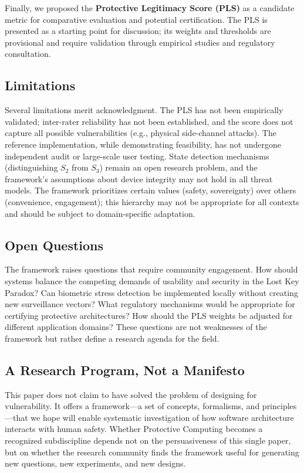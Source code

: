 \documentclass[acmsmall,review]{acmart}
\begin{document}
Finally, we proposed the \textbf{Protective Legitimacy Score (PLS)} as a candidate metric for comparative evaluation and potential certification. The PLS is presented as a starting point for discussion; its weights and thresholds are provisional and require validation through empirical studies and regulatory consultation.

\subsection{Limitations}

Several limitations merit acknowledgment. The PLS has not been empirically validated; inter-rater reliability has not been established, and the score does not capture all possible vulnerabilities (e.g., physical side-channel attacks). The reference implementation, while demonstrating feasibility, has not undergone independent audit or large-scale user testing. State detection mechanisms (distinguishing $S_2$ from $S_3$) remain an open research problem, and the framework's assumptions about device integrity may not hold in all threat models. The framework prioritizes certain values (safety, sovereignty) over others (convenience, engagement); this hierarchy may not be appropriate for all contexts and should be subject to domain-specific adaptation.

\subsection{Open Questions}

The framework raises questions that require community engagement. How should systems balance the competing demands of usability and security in the Lost Key Paradox? Can biometric stress detection be implemented locally without creating new surveillance vectors? What regulatory mechanisms would be appropriate for certifying protective architectures? How should the PLS weights be adjusted for different application domains? These questions are not weaknesses of the framework but rather define a research agenda for the field.

\subsection{A Research Program, Not a Manifesto}

This paper does not claim to have solved the problem of designing for vulnerability. It offers a framework---a set of concepts, formalisms, and principles---that we hope will enable systematic investigation of how software architecture interacts with human safety. Whether Protective Computing becomes a recognized subdiscipline depends not on the persuasiveness of this single paper, but on whether the research community finds the framework useful for generating new questions, new experiments, and new designs.
\end{document}
